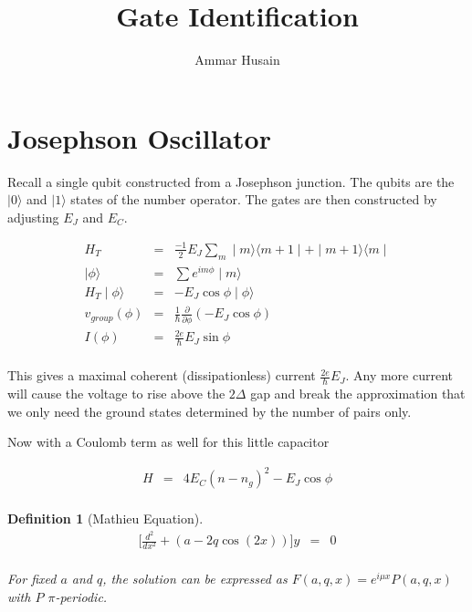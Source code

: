 \documentclass[11pt]{article}
\title{Gate Identification}
\author{Ammar Husain}
\theoremstyle{change}
\newtheorem{definition}[equation]{Definition}
\theoremstyle{nonumberplain}
\numberwithin{equation}{section}
\newcommand\ket[1]{\mid #1 \rangle}
\newcommand\bra[1]{\langle #1 \mid}
\begin{document}
\maketitle

\section{Josephson Oscillator}


Recall a single qubit constructed from a Josephson junction. The qubits are the $\ket{0}$ and $\ket{1}$ states of the number operator. The gates are then constructed by adjusting $E_J$ and $E_C$.

\begin{eqnarray*}
H_T &=& \frac{-1}{2} E_J \sum_m \ket{m} \bra{m+1} + \ket{m+1}\bra{m}\\
\ket{\phi} &=& \sum e^{im\phi} \ket{m}\\
H_T \ket{\phi} &=& -E_J \cos \phi \ket{\phi}\\
v_{group} ( \phi ) &=& \frac{1}{\hbar} \frac{\partial}{\partial \phi} ( - E_J \cos \phi )\\
I ( \phi ) &=& \frac{2e}{\hbar} E_J \sin \phi\\
\end{eqnarray*}

This gives a maximal coherent (dissipationless) current $\frac{2e}{\hbar} E_J$. Any more current will cause the voltage to rise above the $2\Delta$ gap and break the approximation that we only need the ground states determined by the number of pairs only.

Now with a Coulomb term as well for this little capacitor

\begin{eqnarray*}
H &=& 4 E_C ( n - n_g)^2 - E_J \cos \phi\\
\end{eqnarray*}

\begin{definition}[Mathieu Equation]
\begin{eqnarray*}
\big[ \frac{d^2}{dx^2} + ( a - 2 q \cos (2x) ) \big] y &=& 0\\
\end{eqnarray*}

For fixed $a$ and $q$, the solution can be expressed as $F(a,q,x)=e^{i \mu x} P(a,q,x)$ with $P$ $\pi$-periodic. 

\end{definition}
\end{document}
